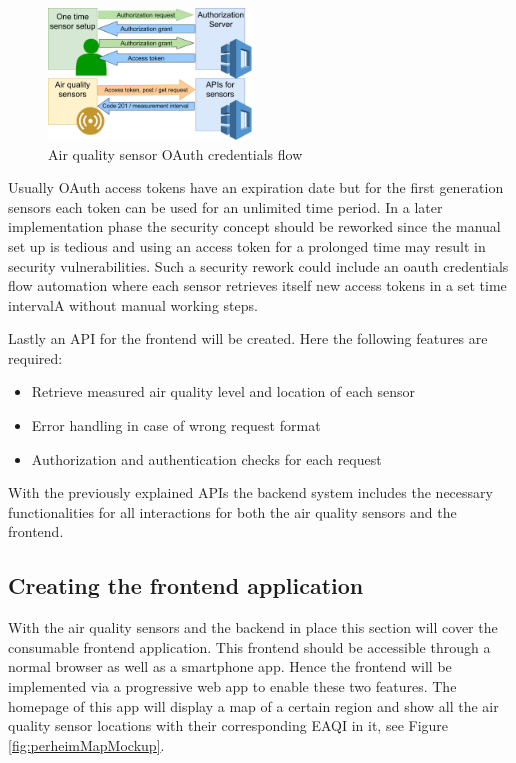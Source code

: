 \documentclass[conference]{IEEEtran}
\begin{document}
\begin{figure}[htbp]
	\centering
	\includegraphics[width=0.48\textwidth]{AirQualityOAuthCredentialsFlow.png}
	\caption{Air quality sensor OAuth credentials flow}
	\label{fig:credentialsFlow}
\end{figure}

Usually OAuth access tokens have an expiration date but for the first generation sensors each token can be used for an unlimited time period. In a later implementation phase the security concept should be reworked since the manual set up is tedious and using an access token for a prolonged time may result in security vulnerabilities. Such a security rework could include an oauth credentials flow automation where each sensor retrieves itself new access tokens in a set time intervalA without manual working steps.

Lastly an API for the frontend will be created. Here the following features are required:
\begin{itemize}
\item Retrieve measured air quality level and location of each sensor
\item Error handling in case of wrong request format
\item Authorization and authentication checks for each request 
\end{itemize}
With the previously explained APIs the backend system includes the necessary functionalities for all interactions for both the air quality sensors and the frontend.


\subsection{Creating the frontend application}
With the air quality sensors and the backend in place this section will cover the consumable frontend application. This frontend should be accessible through a normal browser as well as a smartphone app. Hence the frontend will be implemented via a progressive web app to enable these two features. The homepage of this app will display a map of a certain region and show all the air quality sensor locations with their corresponding EAQI in it, see Figure \ref{fig:perheimMapMockup}.
\end{document}
